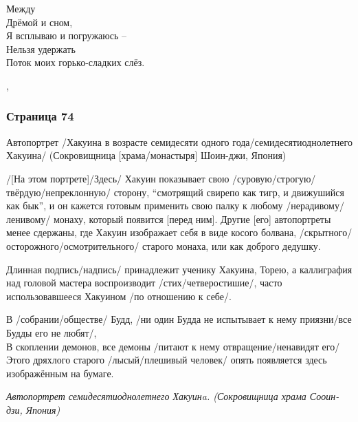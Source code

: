 \begin{ver}[3]
  \begin{verses}
    Между\\
    Дрёмой и сном,\\
    Я всплываю и погружаюсь --\\
    Нельзя удержать\\
    Поток моих горько-сладких слёз.
  \end{verses}
\end{ver}
\sep
 
\subsubsection{Страница 74}
\begin{ver}
Автопортрет /Хакуина в возрасте семидесяти одного
года/семидесятиоднолетнего Хакуина/ (Сокровищница
[храма/монастыря] Шоин-джи, Япония)

/[На этом портрете]/Здесь/ Хакуин показывает свою
/суровую/строгую/твёрдую/непреклонную/ сторону,
``смотрящий свирепо как тигр, и движушийся как бык'', и он кажется
готовым применить свою палку к любому /нерадивому/ленивому/ монаху,
который появится [перед ним]. Другие [его] автопортреты менее
сдержаны, где Хакуин изображает себя в виде косого
болвана, /скрытного/осторожного/осмотрительного/ старого
монаха, или как доброго дедушку.

Длинная подпись/надпись/ принадлежит ученику Хакуина, Торею, а
каллиграфия над головой мастера воспроизводит
/стих/четверостишие/, часто использовавшееся Хакуином /по
отношению к себе/. 
\end{ver}

\begin{ver}
  \begin{verses}
    В /собрании/обществе/ Будд, /ни один Будда не
    испытывает к нему приязни/все Будды его не любят/,\\
    В скоплении демонов, все демоны /питают к нему
    отвращение/ненавидят его/\\ 
    Этого дряхлого старого /лысый/плешивый человек/ опять
    появляется здесь изображённым на бумаге.
  \end{verses}
\end{ver}

\begin{ver}[1]\it
Автопортрет семидесятиоднолетнего Хакуинa. (Сокровищница
храма Сооин-дзи, Япония)
\end{ver}

